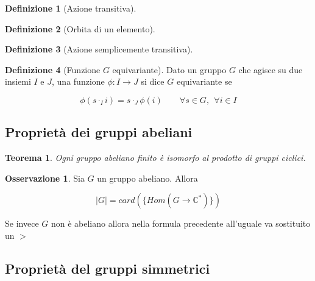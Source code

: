 \documentclass[11pt]{article}
\theoremstyle{plain}
\newtheorem{thm}{Teorema}[section]
\theoremstyle{definition}
\newtheorem{defn}{Definizione}[section]
\newtheorem*{rem}{Osservazione}
\theoremstyle{remark}
\newcommand{\C}{\mathbb{C}}
\begin{document}
\begin{defn}[Azione transitiva]



\label{defn:azione transitiva}
\end{defn}


\begin{defn}[Orbita di un elemento]


\label{defn:orbita}
\end{defn}




\begin{defn}[Azione semplicemente transitiva]

\end{defn}


\begin{defn}[Funzione $G$ equivariante]

Dato un gruppo $G$ che agisce su due insiemi $I$ e $J$, una funzione $\phi: I \to J$ si dice $G$ equivariante se 

\[ \phi(s \cdot_I i) = s \cdot_J \phi(i) \qquad \forall s \in G, \ \ \forall i \in I \]


\end{defn}


















\newpage
\subsection{Proprietà dei gruppi abeliani}



\begin{thm}Ogni gruppo abeliano finito è isomorfo al prodotto di gruppi ciclici.


\end{thm}

\begin{rem} Sia $G$ un gruppo abeliano. Allora 

\[ |G| = card(\{Hom(G \to \C^*) \})\]


Se invece $G$ non è abeliano allora nella formula precedente all'uguale va sostituito un $>$

\end{rem}


\subsection{Proprietà del gruppi simmetrici}
\end{document}
